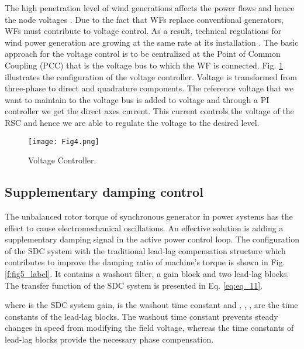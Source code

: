 \documentclass[conference,11pt]{IEEEtran}
\newcommand{\ignore}[2]{\hspace{0in}#2}
\begin{document}
The high penetration level of wind generations affects the power flows and hence the node voltages \cite{ref24}. Due to the fact that WFs replace conventional generators, WFs must contribute to voltage control. As a result, technical regulations for wind power generation are growing at the same rate at its installation \cite{ref25}. The basic approach for the voltage control is to be centralized at the Point of Common Coupling (PCC) that is the voltage bus to which the WF is connected. Fig. \ref{f:fig4_label} illustrates the configuration of the voltage controller. Voltage is transformed from three-phase to direct and quadrature  components. The reference voltage that we want to maintain to the voltage bus is added to  voltage and through a PI controller we get the direct axes current. This current controls the  voltage of the RSC and hence we are able to regulate the voltage to the desired level.

\begin{figure}[t]
  \centering
  \texttt{[image: Fig4.png]}
  \caption{Voltage Controller.}
  \label{f:fig4_label}
\end{figure} 



\subsection{Supplementary damping control}\label{ss:d_control}

The unbalanced rotor torque of synchronous generator in power systems has the effect to cause electromechanical oscillations. An effective solution is adding a supplementary damping signal in the active power control loop.  \ignore {In \cite{ref26}, damping controllers based on the Phillips-Heffron model are designed for damping low frequency oscillations. In this paper, the damping mechanism is presented and implemented to DFIG RSC control loop from the perspective of dynamic frequency.} The configuration of the SDC system with the traditional lead-lag compensation structure which contributes to improve the damping ratio of machine’s torque is shown in Fig. \ref{f:fig5_label}. It contains a washout filter, a gain block and two lead-lag blocks. The transfer function of the SDC system is presented in Eq. \ref{eq:eq_11}.



{\setlength{\parindent}{0cm}
where  is the SDC system gain,  is the washout time constant and , , ,  are the time constants of the lead-lag blocks. The washout time constant prevents steady changes in speed from modifying the field voltage, whereas the time constants of lead-lag blocks provide the necessary phase compensation.}
\end{document}
